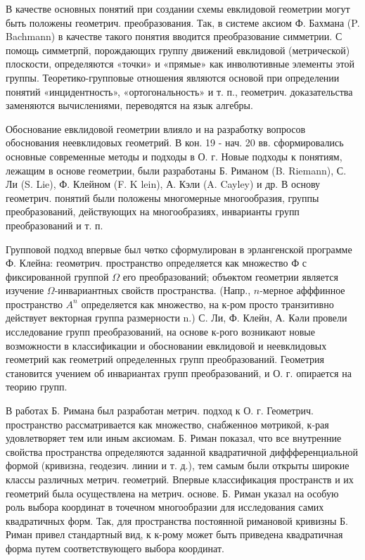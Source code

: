\documentclass[10pt]{article}
\begin{document}
В качестве основных понятий при создании схемы евклидовой геометрии могут быть положены геометрич. преобразования. Так, в системе аксиом Ф. Бахмана (P. Bachmann) в качестве такого понятия вводится преобразование симметрии. С помощь симметрпй, порождающих группу движений евклидовой (метрической) плоскости, определяются «точки» и «прямые» как инволютивные элементы этой группы. Теоретико-групповые отношения являются основой при определении понятий «инцидентность», «ортогональность» и т. п., геометрич. доказательства заменяются вычислениями, переводятся на язык алгебры.



Обоснование евклидовой геометрии влияло и на разработку вопросов обоснования неевклидовых геометрий. В кон. 19 - нач. 20 вв. сформировались основные современные методы и подходы в О. г. Новые подходы к понятиям, лежащим в основе геометрии, были разработаны Б. Риманом (B. Riemann), С. Ли (S. Lie), Ф. Клейном (F. K lein), А. Кэли (A. Cayley) и др. В основу геометрич. понятий были положены многомерные многообразия, группы преобразований, действующих на многообразиях, инварианты групп преобразований и т. п.



Групповой подход впервые был чөтко сформулирован в эрлангенской программе Ф. Клейна: геомөтрич. пространство определяется как множество Ф с фиксированной группой $\Omega$ его преобразований; объөктом геометрии является изучение $\Omega$-инвариантных свойств пространства. (Напр., $n$-мерное афффинное пространство $A^{n}$ определяется как множество, на к-ром просто транзитивно действует векторная группа размерности n.) С. Ли, Ф. Клейн, А. Кәли провели исследование групп преобразований, на основе к-рого возникают новые возможности в классификации и обосновании евклидовой и неевклидовых геометрий как геометрий определенных групп преобразований. Геометрия становится учением об инвариантах групп преобразований, и О. г. опирается на теорию групп.



В работах Б. Римана был разработан метрич. подход к О. г. Геометрич. пространство рассматривается как множество, снабженноө мөтрикой, к-рая удовлетворяет тем или иным аксиомам. Б. Риман показал, что все внутренние свойства пространства определяются заданной квадратичной диффференциальной формой (кривизна, геодезич. линии и т. д.), тем самым были открыты широкие классы различных метрич. геометрий. Впервые классификация пространств и их геометрий была осуществлена на метрич. основе. Б. Риман указал на особую роль выбора координат в точечном многообразии для исследования самих квадратичных форм. Так, для пространства постоянной римановой кривизны Б. Риман привел стандартный вид, к к-рому может быть приведена квадратичная форма путем соответствующего выбора координат.
\end{document}

